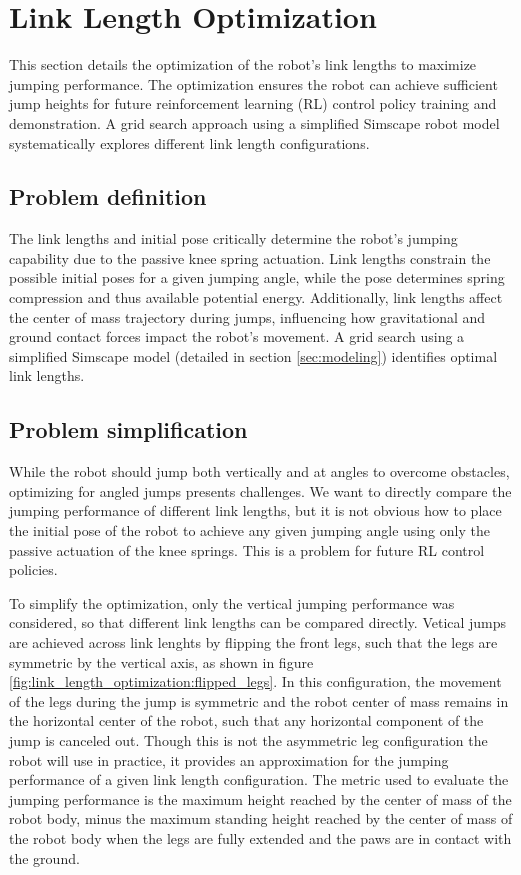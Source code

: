 \section{Link Length Optimization}
This section details the optimization of the robot's link lengths to maximize jumping performance. The optimization ensures the robot can achieve sufficient jump heights for future reinforcement learning (RL) control policy training and demonstration. A grid search approach using a simplified Simscape robot model systematically explores different link length configurations.

\subsection{Problem definition}
The link lengths and initial pose critically determine the robot's jumping capability due to the passive knee spring actuation. Link lengths constrain the possible initial poses for a given jumping angle, while the pose determines spring compression and thus available potential energy. Additionally, link lengths affect the center of mass trajectory during jumps, influencing how gravitational and ground contact forces impact the robot's movement. A grid search using a simplified Simscape model (detailed in section \ref{sec:modeling}) identifies optimal link lengths.

\subsection{Problem simplification}

While the robot should jump both vertically and at angles to overcome obstacles, optimizing for angled jumps presents challenges. We want to directly compare the jumping performance of different link lengths, but it is not obvious how to place the initial pose of the robot to achieve any given jumping angle using only the passive actuation of the knee springs. This is a problem for future RL control policies.


To simplify the optimization, only the vertical jumping performance was considered, so that different link lengths can be compared directly. Vetical jumps are achieved across link lenghts by flipping the front legs, such that the legs are symmetric by the vertical axis, as shown in figure \ref{fig:link_length_optimization:flipped_legs}. In this configuration, the movement of the legs during the jump is symmetric and the robot center of mass remains in the horizontal center of the robot, such that any horizontal component of the jump is canceled out. Though this is not the asymmetric leg configuration the robot will use in practice, it provides an approximation for the jumping performance of a given link length configuration. The metric used to evaluate the jumping performance is the maximum height reached by the center of mass of the robot body, minus the maximum standing height reached by the center of mass of the robot body when the legs are fully extended and the paws are in contact with the ground.

